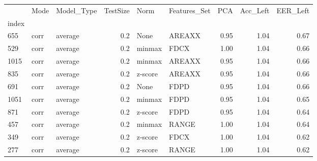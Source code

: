 \begin{tabular}{lllrllrrr}
\toprule
{} &  Mode & Model\_Type &  TestSize &     Norm & Features\_Set &   PCA &  Acc\_Left &  EER\_Left \\
index &       &            &           &          &              &       &           &           \\
\midrule
655   &  corr &    average &       0.2 &     None &       AREAXX &  0.95 &      1.04 &      0.67 \\
529   &  corr &    average &       0.2 &   minmax &         FDCX &  1.00 &      1.04 &      0.66 \\
1015  &  corr &    average &       0.2 &   minmax &       AREAXX &  0.95 &      1.04 &      0.66 \\
835   &  corr &    average &       0.2 &  z-score &       AREAXX &  0.95 &      1.04 &      0.66 \\
691   &  corr &    average &       0.2 &     None &         FDPD &  0.95 &      1.04 &      0.66 \\
1051  &  corr &    average &       0.2 &   minmax &         FDPD &  0.95 &      1.04 &      0.65 \\
871   &  corr &    average &       0.2 &  z-score &         FDPD &  0.95 &      1.04 &      0.64 \\
457   &  corr &    average &       0.2 &   minmax &        RANGE &  1.00 &      1.04 &      0.64 \\
349   &  corr &    average &       0.2 &  z-score &         FDCX &  1.00 &      1.04 &      0.62 \\
277   &  corr &    average &       0.2 &  z-score &        RANGE &  1.00 &      1.04 &      0.62 \\
\bottomrule
\end{tabular}
